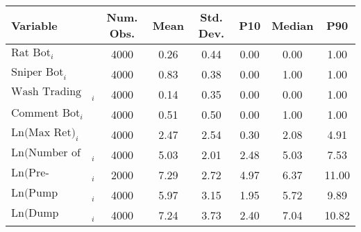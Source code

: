 \begin{tabular}{lcccccc}
\toprule
Variable & Num. Obs. & Mean & Std. Dev. & P10 & Median & P90 \\
\midrule
$\text{Rat Bot}_{i}$ & 4000 & 0.26 & 0.44 & 0.00 & 0.00 & 1.00 \\
$\text{Sniper Bot}_{i}$ & 4000 & 0.83 & 0.38 & 0.00 & 1.00 & 1.00 \\
$\text{Wash Trading Bot}_{i}$ & 4000 & 0.14 & 0.35 & 0.00 & 0.00 & 1.00 \\
$\text{Comment Bot}_{i}$ & 4000 & 0.51 & 0.50 & 0.00 & 1.00 & 1.00 \\
$\text{Ln(Max Ret)}_{i}$ & 4000 & 2.47 & 2.54 & 0.30 & 2.08 & 4.91 \\
$\text{Ln(Number of Traders)}_{i}$ & 4000 & 5.03 & 2.01 & 2.48 & 5.03 & 7.53 \\
$\text{Ln(Pre-Migration Duration)}_{i}$ & 2000 & 7.29 & 2.72 & 4.97 & 6.37 & 11.00 \\
$\text{Ln(Pump Duration)}_{i}$ & 4000 & 5.97 & 3.15 & 1.95 & 5.72 & 9.89 \\
$\text{Ln(Dump Duration)}_{i}$ & 4000 & 7.24 & 3.73 & 2.40 & 7.04 & 10.82 \\
\bottomrule
\end{tabular}